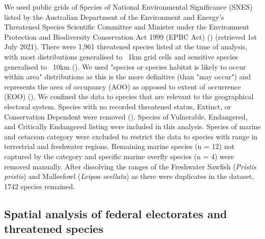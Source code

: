 \documentclass[a4paper,11pt]{article}
\begin{document}
We used public grids of Species of National Environmental Significance (SNES) listed by the Australian Department of the Environment and Energy’s Threatened Species Scientific Committee and Minister under the Environment Protection and Biodiversity Conservation Act 1999 (EPBC Act) (\cite{commonwealthofaustraliaThreatenedSpeciesEPBC2021}) (retrieved 1st July 2021). There were 1,961 threatened species listed at the time of analysis, with most distributions generalised to ~1km grid cells and sensitive species generalised to ~10km (\cite{commonwealthofaustraliaThreatenedSpeciesEPBC2021}). We used "species or species habitat is likely to occur within area" distributions as this is the more definitive (than "may occur") and represents the area of occupancy (AOO) as opposed to extent of occurrence (EOO) (\cite{gastonSizesSpeciesGeographic2009, lloydEstimatingSpatialCoverage2020}). We confined the data to species that are relevant to the geographical electoral system. Species with no recorded threatened status, Extinct, or Conservation Dependent were removed (\cite{wardNationalscaleDatasetThreats2021}). Species of Vulnerable, Endangered, and Critically Endangered listing were included in this analysis. Species of marine and cetacean category were excluded to restrict the data to species with range in terrestrial and freshwater regions. Remaining marine species (n = 12) not captured by the category and specific marine overfly species (n = 4) were removed manually. After dissolving the ranges of the Freshwater Sawfish (\emph{Pristis pristis}) and Malleefowl (\emph{Leipoa ocellata}) as there were duplicates in the dataset, 1742 species remained.

\subsection{Spatial analysis of federal electorates and threatened species}
\end{document}
